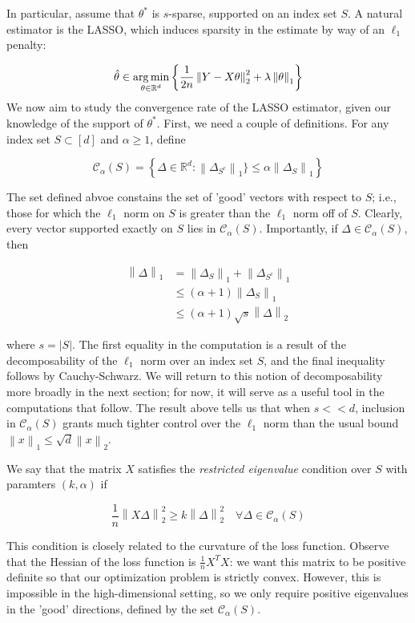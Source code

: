 \documentclass{article}
\newcommand{\R}{\mathbb{R}}
\newcommand{\cC}{\mathcal{C}}
\newcommand{\argmin}{\mathop{\rm arg\,min}}
\newcommand{\norm}[1]{\left\|#1\right\|}
\begin{document}
In particular, assume that $\theta^{*}$ is $s$-sparse, supported on an index set $S$. A natural estimator is the LASSO, which induces sparsity in the estimate by way of an $\ell_{1}$ penalty:

$$\hat{\theta} \in \argmin_{\theta \in \R^{d}}\left\{\frac{1}{2n}\norm{Y - X\theta}^{2}_{2} + \lambda \norm{\theta}_{1}\right\}$$
We now aim to study the convergence rate of the LASSO estimator, given our knowledge of the support of $\theta^{*}$. First, we need a couple of definitions. For any index set $S \subset [d]$ and $\alpha \geq 1$, define

$$\cC_{\alpha}(S) = \left\{ \Delta \in \R^{d} : \norm{\Delta_{S^{c}}}_{1}\} \leq \alpha \norm{\Delta_{S}}_{1}\right\}$$

The set defined abvoe constains the set of 'good' vectors with respect to $S$; i.e., those for which the $\ell_{1}$ norm on $S$ is greater than the $\ell_{1}$ norm off of $S$. Clearly, every vector supported exactly on $S$ lies in $\cC_{\alpha}(S)$. Importantly, if $\Delta \in \cC_{\alpha}(S)$, then

\begin{align*}
  \norm{\Delta}_{1}
  &= \norm{\Delta_{S}}_{1} + \norm{\Delta_{S^{c}}}_{1} \\
  &\leq (\alpha + 1)\norm{\Delta_{S}}_{1} \\
  &\leq (\alpha + 1)\sqrt{s}\norm{\Delta}_{2}
\end{align*}

where $s = |S|$. The first equality in the computation is a result of the decomposability of the $\ell_{1}$ norm over an index set $S$, and the final inequality follows by Cauchy-Schwarz. We will return to this notion of  decomposability more broadly in the next section; for now, it will serve as a useful tool in the computations that follow. The result above tells us that when $s << d$, inclusion in $\cC_{\alpha}(S)$ grants much tighter control over the $\ell_{1}$ norm than the usual bound $\norm{x}_{1} \leq \sqrt{d}\norm{x}_{2}$.

We say that the matrix $X$ satisfies the \textit{restricted eigenvalue} condition over $S$ with paramters $(k, \alpha)$ if

$$\frac1n\norm{X\Delta}_{2}^{2} \geq k\norm{\Delta}_{2}^{2} \quad \forall \Delta \in \cC_{\alpha}(S)$$

This condition is closely related to the curvature of the loss function. Observe that the Hessian of the loss function is $\frac1n X^{T}X$: we want this matrix to be positive definite so that our optimization problem is strictly convex. However, this is impossible in the high-dimensional setting, so we only require positive eigenvalues in the 'good' directions, defined by the set $\cC_{\alpha}(S)$.
\end{document}
